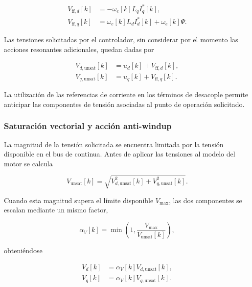 \begin{align}
V_{\mathrm{ff},d}[k]
&=
-\omega_e[k]L_qI_q^{*}[k],
\label{eq:desacople_d}
\\
V_{\mathrm{ff},q}[k]
&=
\omega_e[k]L_dI_d^{*}[k]
+
\omega_e[k]\Psi.
\label{eq:desacople_q}
\end{align}

Las tensiones solicitadas por el controlador, sin considerar por el
momento las acciones resonantes adicionales, quedan dadas por

\begin{align}
V_{d,\mathrm{unsat}}[k]
&=
u_d[k]
+
V_{\mathrm{ff},d}[k],
\\
V_{q,\mathrm{unsat}}[k]
&=
u_q[k]
+
V_{\mathrm{ff},q}[k].
\end{align}

La utilización de las referencias de corriente en los términos de
desacople permite anticipar las componentes de tensión asociadas al
punto de operación solicitado.


\subsubsection{Saturación vectorial y acción anti-windup}
\label{subsubsec:saturacion_corriente}

La magnitud de la tensión solicitada se encuentra limitada por la
tensión disponible en el bus de continua. Antes de aplicar las
tensiones al modelo del motor se calcula

\begin{equation}
V_{\mathrm{unsat}}[k]
=
\sqrt{
V_{d,\mathrm{unsat}}^2[k]
+
V_{q,\mathrm{unsat}}^2[k]
}.
\end{equation}

Cuando esta magnitud supera el límite disponible $V_{\max}$, las dos
componentes se escalan mediante un mismo factor,

\begin{equation}
\alpha_V[k]
=
\min\left(
1,
\frac{V_{\max}}
     {V_{\mathrm{unsat}}[k]}
\right),
\end{equation}

obteniéndose

\begin{align}
V_d[k]
&=
\alpha_V[k]V_{d,\mathrm{unsat}}[k],
\\
V_q[k]
&=
\alpha_V[k]V_{q,\mathrm{unsat}}[k].
\end{align}

